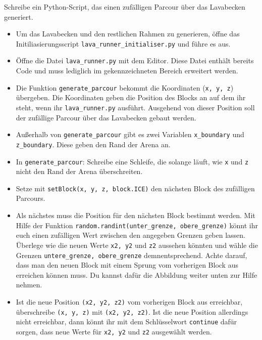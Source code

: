 \large Schreibe ein Python-Script, das einen zufälligen Parcour über das Lavabecken generiert.
\begin{itemize}
	\item Um das Lavabecken und den restlichen Rahmen zu generieren, öffne das Initiliasierungsscript \texttt{lava\_runner\_initialiser.py} und führe es aus.
	
	\item Öffne die Datei \texttt{lava\_runner.py} mit dem Editor. Diese Datei enthält bereits Code und muss lediglich im gekennzeichneten Bereich erweitert werden.
	
	\item Die Funktion \texttt{generate\_parcour} bekommt die Koordinaten (\texttt{x, y, z}) übergeben. Die Koordinaten geben die Position des Blocks an auf dem ihr steht, wenn ihr \texttt{lava\_runner.py} ausführt. Ausgehend von dieser Position soll der zufällige Parcour über das Lavabecken gebaut werden.
	
	\item Außerhalb von \texttt{generate\_parcour} gibt es zwei Variablen \texttt{x\_boundary} und \texttt{z\_boundary}. Diese geben den Rand der Arena an.
	
	\item In \texttt{generate\_parcour}: Schreibe eine Schleife, die solange läuft, wie \texttt{x} und \texttt{z} nicht den Rand der Arena überschreiten.
	
	\item  Setze mit \texttt{setBlock(x, y, z, block.ICE)} den nächsten Block des zufälligen Parcours.
	
	\item Als nächstes muss die Position für den nächsten Block bestimmt werden. Mit Hilfe der Funktion \texttt{random.randint(unter\_grenze, obere\_grenze)} könnt ihr euch einen zufälligen Wert zwischen den angegeben Grenzen geben lassen. Überlege wie die neuen Werte \texttt{x2, y2} und \texttt{z2} aussehen könnten und wähle die Grenzen \texttt{untere\_grenze, obere\_grenze} demnentsprechend. Achte darauf, dass man den neuen Block mit einem Sprung vom vorherigen Block aus erreichen können muss. Du kannst dafür die Abbildung weiter unten zur Hilfe nehmen.
	
	\item Ist die neue Position \texttt{(x2, y2, z2)} vom vorherigen Block aus erreichbar, überschreibe \texttt{(x, y, z)} mit \texttt{(x2, y2, z2)}. Ist die neue Position allerdings nicht erreichbar, dann könnt ihr mit dem Schlüsselwort \texttt{continue} dafür sorgen, dass neue Werte für \texttt{x2, y2} und \texttt{z2} ausgewählt werden.

\end{itemize}

